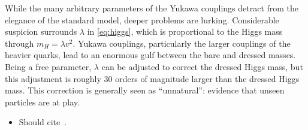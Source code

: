 While the many arbitrary parameters of the Yukawa couplings detract from the elegance of the standard model, deeper problems are lurking. Considerable suspicion surrounds $\lambda$ in \cref{eq:higgs}, which is proportional to the Higgs mass through $m_{H} = \lambda v^2$. Yukawa couplings, particularly the larger couplings of the heavier quarks, lead to an enormous gulf between the bare and dressed masses.
Being a free parameter, $\lambda$ can be adjusted to correct the dressed Higgs mass, but this adjustment is roughly 30 orders of magnitude larger than the dressed Higgs mass. This correction is generally seen as ``unnatural'': evidence that unseen particles are at play.


\begin{itemize}
\item Should cite~\cite{ewuv,ewgaugeinvariance,weakinthev}.
\end{itemize}







